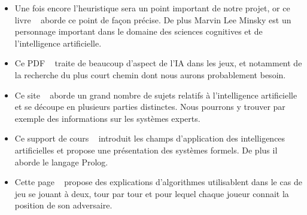 \documentclass[12pt]{article}
\begin{document}
\begin{itemize}
\item Une fois encore l'heuristique sera un point important de notre projet, or ce livre ~\cite{ref8} aborde ce point de façon précise. De plus Marvin Lee Minsky est un personnage important dans le domaine des sciences cognitives et de l'intelligence artificielle.\\[1\baselineskip]

\item Ce PDF ~\cite{ref9} traite de beaucoup d'aspect de l'IA dans les jeux, et notamment de la recherche du plus court chemin dont nous aurons probablement besoin.\\[1\baselineskip]

\item Ce site ~\cite{ref10} aborde un grand nombre de sujets relatifs à l'intelligence artificielle et se découpe en plusieurs parties distinctes. Nous pourrons y trouver par exemple des informations sur les systèmes experts.\\[1\baselineskip]

\item Ce support de cours ~\cite{ref11} introduit les champs d'application des intelligences artificielles et propose une présentation des systèmes formels. De plus il aborde le langage Prolog.\\[1\baselineskip]

\item Cette page ~\cite{ref12} propose des explications d'algorithmes utilisablent dans le cas de jeu se jouant à deux, tour par tour et pour lequel chaque joueur connait la position de son adversaire.\\[1\baselineskip]


\end{itemize}

{}

\end{document}
